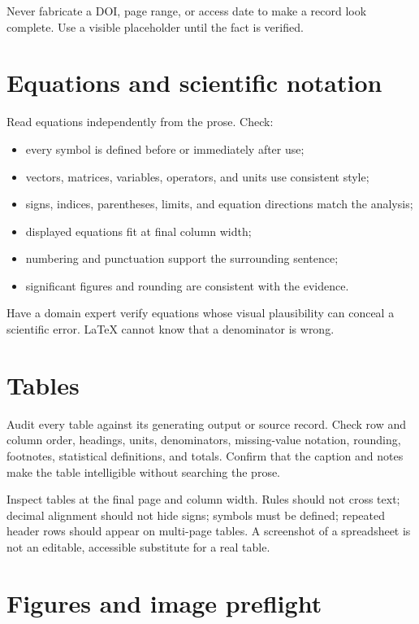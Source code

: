 Never fabricate a DOI, page range, or access date to make a record look complete.
Use a visible placeholder until the fact is verified.

\section{Equations and scientific notation}

Read equations independently from the prose. Check:

\begin{itemize}
  \item every symbol is defined before or immediately after use;
  \item vectors, matrices, variables, operators, and units use consistent style;
  \item signs, indices, parentheses, limits, and equation directions match the
        analysis;
  \item displayed equations fit at final column width;
  \item numbering and punctuation support the surrounding sentence;
  \item significant figures and rounding are consistent with the evidence.
\end{itemize}

Have a domain expert verify equations whose visual plausibility can conceal a
scientific error. \LaTeX{} cannot know that a denominator is wrong.

\section{Tables}

Audit every table against its generating output or source record. Check row and
column order, headings, units, denominators, missing-value notation, rounding,
footnotes, statistical definitions, and totals. Confirm that the caption and
notes make the table intelligible without searching the prose.

Inspect tables at the final page and column width. Rules should not cross text;
decimal alignment should not hide signs; symbols must be defined; repeated
header rows should appear on multi-page tables. A screenshot of a spreadsheet
is not an editable, accessible substitute for a real table.

\section{Figures and image preflight}

